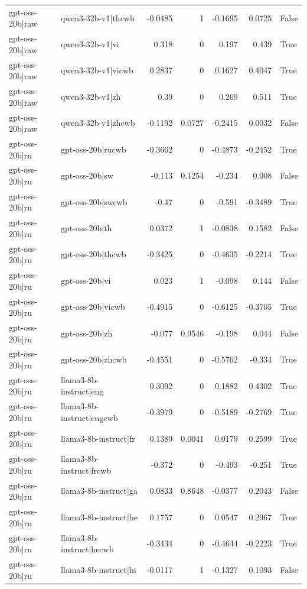 \begin{table}
\begin{tabular}{l l r r r r l}
gpt-oss-20b|raw & qwen3-32b-v1|thcwb & -0.0485 & 1 & -0.1695 & 0.0725 & False \\
gpt-oss-20b|raw & qwen3-32b-v1|vi & 0.318 & 0 & 0.197 & 0.439 & True \\
gpt-oss-20b|raw & qwen3-32b-v1|vicwb & 0.2837 & 0 & 0.1627 & 0.4047 & True \\
gpt-oss-20b|raw & qwen3-32b-v1|zh & 0.39 & 0 & 0.269 & 0.511 & True \\
gpt-oss-20b|raw & qwen3-32b-v1|zhcwb & -0.1192 & 0.0727 & -0.2415 & 0.0032 & False \\
gpt-oss-20b|ru & gpt-oss-20b|rucwb & -0.3662 & 0 & -0.4873 & -0.2452 & True \\
gpt-oss-20b|ru & gpt-oss-20b|sw & -0.113 & 0.1254 & -0.234 & 0.008 & False \\
gpt-oss-20b|ru & gpt-oss-20b|swcwb & -0.47 & 0 & -0.591 & -0.3489 & True \\
gpt-oss-20b|ru & gpt-oss-20b|th & 0.0372 & 1 & -0.0838 & 0.1582 & False \\
gpt-oss-20b|ru & gpt-oss-20b|thcwb & -0.3425 & 0 & -0.4635 & -0.2214 & True \\
gpt-oss-20b|ru & gpt-oss-20b|vi & 0.023 & 1 & -0.098 & 0.144 & False \\
gpt-oss-20b|ru & gpt-oss-20b|vicwb & -0.4915 & 0 & -0.6125 & -0.3705 & True \\
gpt-oss-20b|ru & gpt-oss-20b|zh & -0.077 & 0.9546 & -0.198 & 0.044 & False \\
gpt-oss-20b|ru & gpt-oss-20b|zhcwb & -0.4551 & 0 & -0.5762 & -0.334 & True \\
gpt-oss-20b|ru & llama3-8b-instruct|eng & 0.3092 & 0 & 0.1882 & 0.4302 & True \\
gpt-oss-20b|ru & llama3-8b-instruct|engcwb & -0.3979 & 0 & -0.5189 & -0.2769 & True \\
gpt-oss-20b|ru & llama3-8b-instruct|fr & 0.1389 & 0.0041 & 0.0179 & 0.2599 & True \\
gpt-oss-20b|ru & llama3-8b-instruct|frcwb & -0.372 & 0 & -0.493 & -0.251 & True \\
gpt-oss-20b|ru & llama3-8b-instruct|ga & 0.0833 & 0.8648 & -0.0377 & 0.2043 & False \\
gpt-oss-20b|ru & llama3-8b-instruct|he & 0.1757 & 0 & 0.0547 & 0.2967 & True \\
gpt-oss-20b|ru & llama3-8b-instruct|hecwb & -0.3434 & 0 & -0.4644 & -0.2223 & True \\
gpt-oss-20b|ru & llama3-8b-instruct|hi & -0.0117 & 1 & -0.1327 & 0.1093 & False \\

\end{tabular}
\end{table}
